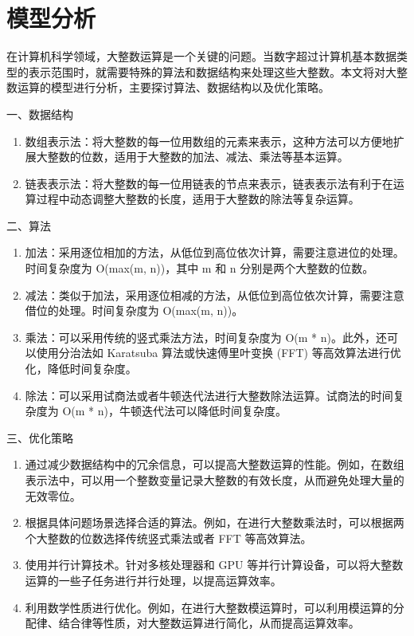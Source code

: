 \documentclass{article}
\begin{document}
\section{模型分析}
在计算机科学领域，大整数运算是一个关键的问题。当数字超过计算机基本数据类型的表示范围时，就需要特殊的算法和数据结构来处理这些大整数。本文将对大整数运算的模型进行分析，主要探讨算法、数据结构以及优化策略。

一、数据结构

\begin{enumerate}
    \item 数组表示法：将大整数的每一位用数组的元素来表示，这种方法可以方便地扩展大整数的位数，适用于大整数的加法、减法、乘法等基本运算。
    \item 链表表示法：将大整数的每一位用链表的节点来表示，链表表示法有利于在运算过程中动态调整大整数的长度，适用于大整数的除法等复杂运算。
\end{enumerate}

二、算法

\begin{enumerate}
    \item 加法：采用逐位相加的方法，从低位到高位依次计算，需要注意进位的处理。时间复杂度为 O(max(m, n))，其中 m 和 n 分别是两个大整数的位数。
    \item 减法：类似于加法，采用逐位相减的方法，从低位到高位依次计算，需要注意借位的处理。时间复杂度为 O(max(m, n))。
    \item 乘法：可以采用传统的竖式乘法方法，时间复杂度为 O(m * n)。此外，还可以使用分治法如 Karatsuba 算法或快速傅里叶变换 (FFT) 等高效算法进行优化，降低时间复杂度。
    \item 除法：可以采用试商法或者牛顿迭代法进行大整数除法运算。试商法的时间复杂度为 O(m * n)，牛顿迭代法可以降低时间复杂度。
\end{enumerate}

三、优化策略

\begin{enumerate}
    \item 通过减少数据结构中的冗余信息，可以提高大整数运算的性能。例如，在数组表示法中，可以用一个整数变量记录大整数的有效长度，从而避免处理大量的无效零位。
    \item 根据具体问题场景选择合适的算法。例如，在进行大整数乘法时，可以根据两个大整数的位数选择传统竖式乘法或者 FFT 等高效算法。
    \item 使用并行计算技术。针对多核处理器和 GPU 等并行计算设备，可以将大整数运算的一些子任务进行并行处理，以提高运算效率。
    \item 利用数学性质进行优化。例如，在进行大整数模运算时，可以利用模运算的分配律、结合律等性质，对大整数运算进行简化，从而提高运算效率。
\end{enumerate}
\end{document}
